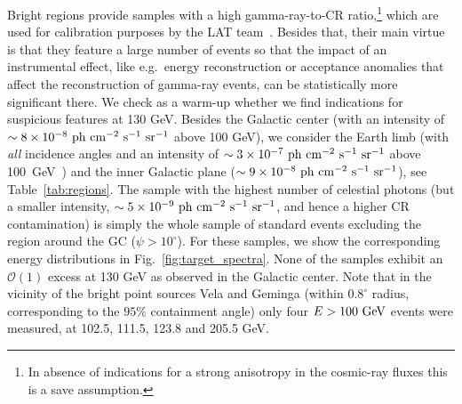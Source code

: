 \documentclass[aps,twocolumn,prd,superscriptaddress,showpacs,nofootinbib,fixfloat]{revtex4}
\newcommand{\s}{{\rm ~s}}
\newcommand{\cm}{{\rm ~cm}}
\newcommand{\ph}{{\rm ~ph}}
\newcommand{\sr}{{\rm ~sr}}
\newcommand{\GeV}{{\rm ~GeV}}
\begin{document}
Bright regions provide samples with a high gamma-ray-to-CR
ratio,\footnote{In absence of indications for a strong anisotropy in the
cosmic-ray fluxes this is a save assumption.}
which are used for calibration purposes by the LAT team~\cite{collaboration:2012kca}.
Besides that, their main virtue is that they feature a large number of events so
that the impact of an instrumental effect, like e.g.~energy
reconstruction or acceptance anomalies that affect the reconstruction of
gamma-ray events, can be statistically more
significant there. 
We check as a warm-up whether we find indications for
suspicious features at 130 GeV.
Besides the Galactic center (with an intensity of $\sim 8\times10^{-8}
\ph\cm^{-2}\s^{-1}\sr^{-1}$ above 100 GeV), we consider the
Earth limb (with \emph{all} incidence angles and an intensity of $\sim3\times10^{-7}
\ph \cm^{-2}\s^{-1}\sr^{-1}$ above 100~GeV~\cite{FermiLimb}) and the inner
Galactic plane
($\sim9\times10^{-8}\ph\cm^{-2}\s^{-1}\sr^{-1}$), see
Table~\ref{tab:regions}. 
The sample with the highest number of celestial photons 
(but a smaller intensity, $\sim5\times10^{-9}\ph\cm^{-2}\s^{-1}\sr^{-1}$, and hence
a higher CR contamination) is
simply the whole sample of
standard events excluding the region around the GC
($\psi>10^\circ$).
For these samples, we show the corresponding energy
distributions in Fig.~\ref{fig:target_spectra}. None of the
samples exhibit an $\mathcal{O}(1)$ excess at 130 GeV as
observed in the Galactic center. Note that in the vicinity
of the bright point sources Vela and Geminga (within
$0.8^\circ$ radius, corresponding to the $95\%$ containment angle) 
only four $E>100\GeV$ events were measured, at
102.5, 111.5, 123.8 and 205.5 GeV.
\medskip
\end{document}
